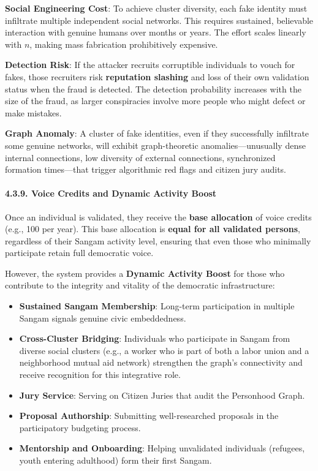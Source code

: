\textbf{Social Engineering Cost}: To achieve cluster diversity, each
fake identity must infiltrate multiple independent social networks. This
requires sustained, believable interaction with genuine humans over
months or years. The effort scales linearly with \(n\), making mass
fabrication prohibitively expensive.

\textbf{Detection Risk}: If the attacker recruits corruptible
individuals to vouch for fakes, those recruiters risk \textbf{reputation
slashing} and loss of their own validation status when the fraud is
detected. The detection probability increases with the size of the
fraud, as larger conspiracies involve more people who might defect or
make mistakes.

\textbf{Graph Anomaly}: A cluster of fake identities, even if they
successfully infiltrate some genuine networks, will exhibit
graph-theoretic anomalies---unusually dense internal connections, low
diversity of external connections, synchronized formation times---that
trigger algorithmic red flags and citizen jury audits.

\paragraph{4.3.9. Voice Credits and Dynamic Activity
Boost}\label{voice-credits-and-dynamic-activity-boost}

Once an individual is validated, they receive the \textbf{base
allocation} of voice credits (e.g., 100 per year). This base allocation
is \textbf{equal for all validated persons}, regardless of their Sangam
activity level, ensuring that even those who minimally participate
retain full democratic voice.

However, the system provides a \textbf{Dynamic Activity Boost} for those
who contribute to the integrity and vitality of the democratic
infrastructure:

\begin{itemize}
\tightlist
\item
  \textbf{Sustained Sangam Membership}: Long-term participation in
  multiple Sangam signals genuine civic embeddedness.
\item
  \textbf{Cross-Cluster Bridging}: Individuals who participate in Sangam
  from diverse social clusters (e.g., a worker who is part of both a
  labor union and a neighborhood mutual aid network) strengthen the
  graph's connectivity and receive recognition for this integrative
  role.
\item
  \textbf{Jury Service}: Serving on Citizen Juries that audit the
  Personhood Graph.
\item
  \textbf{Proposal Authorship}: Submitting well-researched proposals in
  the participatory budgeting process.
\item
  \textbf{Mentorship and Onboarding}: Helping unvalidated individuals
  (refugees, youth entering adulthood) form their first Sangam.
\end{itemize}

